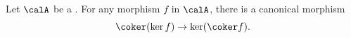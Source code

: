 \begin{lemma} \label{lemma:canonical_morphism_from_cokernel_of_kernel_to_kernel_of_cokernel_in_a_preabelian_category}
    Let $\calA$ be a . 
    For any morphism $f$ in $\calA$, there is a canonical morphism
    $$\coker(\ker f) \to \ker(\coker f).$$
\end{lemma}
